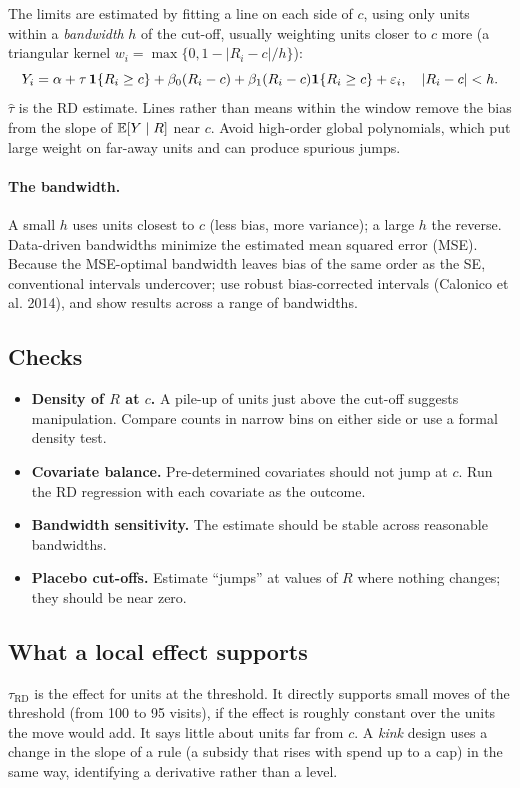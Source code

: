 \documentclass[11pt]{article}
\begin{document}
The limits are estimated by fitting a line on each side of $c$, using only units within a \emph{bandwidth} $h$ of the cut-off, usually weighting
units closer to $c$ more (a triangular kernel $w_i = \max\{0, 1 - |R_i - c|/h\}$):
\[
  Y_i = \alpha + \tau\,\mathbf{1}\{R_i \ge c\} + \beta_0(R_i - c) + \beta_1(R_i - c)\mathbf{1}\{R_i \ge c\} + \varepsilon_i, \quad |R_i - c| < h .
\]
$\hat\tau$ is the RD estimate. Lines rather than means within the window remove the bias from the slope of $\mathbb{E}[Y \mid R]$ near $c$. Avoid high-order global
polynomials, which put large weight on far-away units and can produce spurious jumps.

\paragraph{The bandwidth.} A small $h$ uses units closest to $c$ (less bias, more variance); a large $h$ the reverse. Data-driven bandwidths minimize
the estimated mean squared error (MSE). Because the MSE-optimal bandwidth leaves bias of the same order as the SE, conventional intervals undercover;
use robust bias-corrected intervals (Calonico et al. 2014), and show results across a range of bandwidths.

\subsection{Checks}

\begin{itemize}
  \item \textbf{Density of $R$ at $c$.} A pile-up of units just above the cut-off suggests manipulation. Compare counts in narrow bins on either side or
  use a formal density test.
  \item \textbf{Covariate balance.} Pre-determined covariates should not jump at $c$. Run the RD regression with each covariate as the outcome.
  \item \textbf{Bandwidth sensitivity.} The estimate should be stable across reasonable bandwidths.
  \item \textbf{Placebo cut-offs.} Estimate ``jumps'' at values of $R$ where nothing changes; they should be near zero.
\end{itemize}

\subsection{What a local effect supports}

$\tau_{\text{RD}}$ is the effect for units at the threshold. It directly supports small moves of the threshold (from 100 to 95 visits), if the effect is
roughly constant over the units the move would add. It says little about units far from $c$. A \emph{kink} design uses a change in the slope of a
rule (a subsidy that rises with spend up to a cap) in the same way, identifying a derivative rather than a level.
\end{document}
